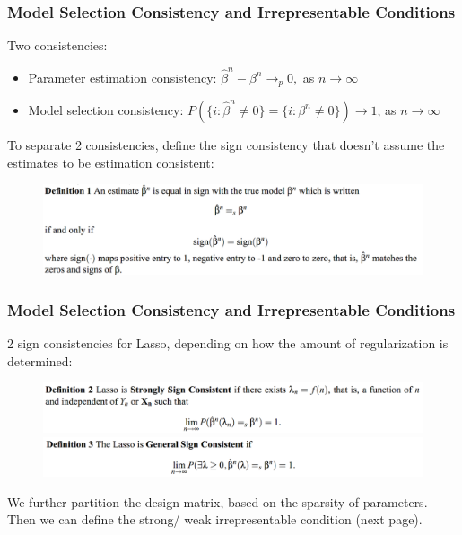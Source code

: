 \documentclass{beamer}
\begin{document}
	\begin{frame}
		\frametitle{Model Selection Consistency and Irrepresentable Conditions}
		Two consistencies:
		\begin{itemize}
			\item 
			Parameter estimation consistency: $\hat{\beta}^n - \beta^n \to_p 0,$ as $n \to \infty$
			\item
			Model selection consistency: $P(\{i: \hat{\beta}^n \ne 0\} = \{i: \beta^n \ne 0\}) \to 1$, as $n \to \infty$
		\end{itemize}
		To separate 2 consistencies, define the sign consistency that doesn't assume the estimates to be estimation consistent:
		\begin{figure}
			\includegraphics[width=1\linewidth]{image001.png}
		\end{figure}
	\end{frame}
	
	\begin{frame}
		\frametitle{Model Selection Consistency and Irrepresentable Conditions}
		2 sign consistencies for Lasso, depending on how the amount of regularization is determined:
		\begin{figure}
			\includegraphics[width=1\linewidth]{image002.png}
			\includegraphics[width=1\linewidth]{image003.png}
		\end{figure}
		We further partition the design matrix, based on the sparsity of parameters. Then we can define the strong/ weak irrepresentable condition (next page).
		
	\end{frame}
	
\end{document}

